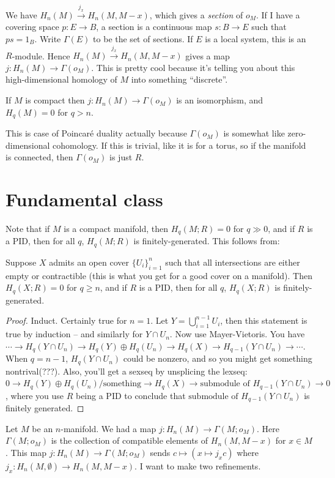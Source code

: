 We have $H_n(M)\xrightarrow{j_x}H_n(M,M-x)$, which gives a \emph{section} of $o_M$. If I have a covering space $p:E\to B$, a section is a continuous map $s:B\to E$ such that $ps=1_B$. Write $\Gamma(E)$ to be the set of sections. If $E$ is a local system, this is an $R$-module. Hence $H_n(M)\xrightarrow{j_x}H_n(M,M-x)$ gives a map $j:H_n(M)\to \Gamma(o_M)$. This is pretty cool because it's telling you about this high-dimensional homology of $M$ into something ``discrete''.
\begin{theorem}
If $M$ is compact then $j:H_n(M)\to\Gamma(o_M)$ is an isomorphism, and $H_q(M)=0$ for $q>n$.
\end{theorem}
This is case of Poincar\'{e} duality actually because $\Gamma(o_M)$ is somewhat like zero-dimensional cohomology. If this is trivial, like it is for a torus, so if the manifold is connected, then $\Gamma(o_M)$ is just $R$.
\section{Fundamental class}
Note that if $M$ is a compact manifold, then $H_q(M;R)=0$ for $q\gg 0$, and if $R$ is a PID, then for all $q$, $H_q(M;R)$ is finitely-generated. This follows from:
\begin{claim}
Suppose $X$ admits an open cover $\{U_i\}_{i=1}^n$ such that all intersections are either empty or contractible (this is what you get for a good cover on a manifold). Then $H_q(X;R)=0$ for $q\geq n$, and if $R$ is a PID, then for all $q$, $H_q(X;R)$ is finitely-generated.
\end{claim}
\begin{proof}
Induct. Certainly true for $n=1$. Let $Y=\bigcup^{n-1}_{i=1}U_i$, then this statement is true by induction -- and similarly for $Y\cap U_n$. Now use Mayer-Vietoris. You have $\cdots\to H_q(Y\cap U_n)\to H_q(Y)\oplus H_q(U_n)\to H_q(X)\to H_{q-1}(Y\cap U_n)\to\cdots$. When $q=n-1$, $H_q(Y\cap U_n)$ could be nonzero, and so you might get something nontrival(???). Also, you'll get a sexseq by unsplicing the lexseq: $0\to H_q(Y)\oplus H_q(U_n)/\text{something}\to H_q(X)\to \text{submodule of }H_{q-1}(Y\cap U_n)\to 0$, where you use $R$ being a PID to conclude that $\text{submodule of }H_{q-1}(Y\cap U_n)$ is finitely generated.
\end{proof}
Let $M$ be an $n$-manifold. We had a map $j:H_n(M)\to \Gamma(M;o_M)$. Here $\Gamma(M;o_M)$ is the collection of compatible elements of $H_n(M,M-x)$ for $x\in M$. This map $j:H_n(M)\to \Gamma(M;o_M)$ sends $c\mapsto(x\mapsto j_x c)$ where $j_x:H_n(M,\emptyset)\to H_n(M,M-x)$. I want to make two refinements.

